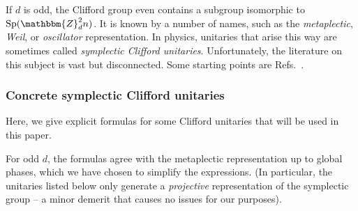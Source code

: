 \documentclass[aps,nofootinbib,floatfix,a4paper]{revtex4}
\newcommand{\1}{\mbox{$\mathbf{1}$}}
\def\ZZ{\mathbbm{Z}}
\DeclareMathOperator{\Sp}{Sp}
\begin{document}
If $d$ is odd, %
the Clifford group even contains a subgroup isomorphic to $\Sp(\ZZ_d^2n)$.
It is known by a number of names, such as the \emph{metaplectic}, \emph{Weil}, or \emph{oscillator} representation.
In physics, unitaries that arise this way are sometimes called \emph{symplectic Clifford unitaries}.
Unfortunately, the literature on this subject is vast but disconnected.
Some starting points are Refs.~\cite{gerardin,folland_harmonic,neuhauser2002explicit,appleby2005symmetric,nebe2006self,gross2021schur}. 

\subsubsection{Concrete symplectic Clifford unitaries}
\label{sec:concrete_cliffords}

Here, we give explicit formulas for some Clifford unitaries that will be used in this paper.

For odd $d$, the formulas agree with the metaplectic representation up to global phases, which we have chosen to simplify the expressions.
(In particular, the unitaries listed below only generate a \emph{projective} representation of the symplectic group -- a minor demerit that causes no issues for our purposes).
\end{document}

